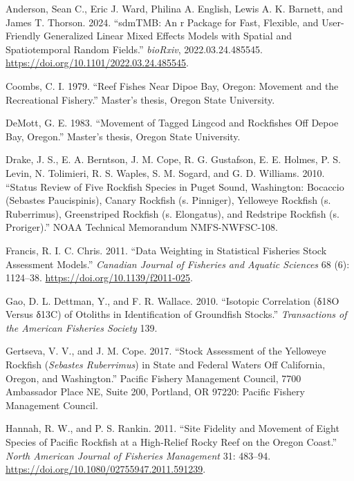 \documentclass[
]{scrartcl}
\newlength{\cslhangindent}
\newenvironment{CSLReferences}[2] %
 {\begin{list}{}{%
  \setlength{\itemindent}{0pt}
  \setlength{\leftmargin}{0pt}
  \setlength{\parsep}{0pt}
  \ifodd #1
   \setlength{\leftmargin}{\cslhangindent}
   \setlength{\itemindent}{-1\cslhangindent}
  \fi
  \setlength{\itemsep}{#2\baselineskip}}}
 {\end{list}}
\begin{document}
\label{refs}
\begin{CSLReferences}{1}{0}
Anderson, Sean C., Eric J. Ward, Philina A. English, Lewis A. K.
Barnett, and James T. Thorson. 2024. {``sdmTMB: An r Package for Fast,
Flexible, and User-Friendly Generalized Linear Mixed Effects Models with
Spatial and Spatiotemporal Random Fields.''} \emph{bioRxiv},
2022.03.24.485545. \url{https://doi.org/10.1101/2022.03.24.485545}.

Coombs, C. I. 1979. {``Reef Fishes Near Dipoe Bay, Oregon: Movement and
the Recreational Fishery.''} Master's thesis, Oregon State University.

DeMott, G. E. 1983. {``Movement of Tagged Lingcod and Rockfishes Off
Depoe Bay, Oregon.''} Master's thesis, Oregon State University.

Drake, J. S., E. A. Berntson, J. M. Cope, R. G. Gustafson, E. E. Holmes,
P. S. Levin, N. Tolimieri, R. S. Waples, S. M. Sogard, and G. D.
Williams. 2010. {``Status Review of Five Rockfish Species in Puget
Sound, Washington: Bocaccio (Sebastes Paucispinis), Canary Rockfish (s.
Pinniger), Yelloweye Rockfish (s. Ruberrimus), Greenstriped Rockfish (s.
Elongatus), and Redstripe Rockfish (s. Proriger).''} NOAA Technical
Memorandum NMFS-NWFSC-108.

Francis, R. I. C. Chris. 2011. {``Data Weighting in Statistical
Fisheries Stock Assessment Models.''} \emph{Canadian Journal of
Fisheries and Aquatic Sciences} 68 (6): 1124--38.
\url{https://doi.org/10.1139/f2011-025}.

Gao, D. L. Dettman, Y., and F. R. Wallace. 2010. {``Isotopic Correlation
(δ18O Versus δ13C) of Otoliths in Identification of Groundfish
Stocks.''} \emph{Transactions of the American Fisheries Society} 139.

Gertseva, V. V., and J. M. Cope. 2017. {``Stock Assessment of the
Yelloweye Rockfish (\emph{{Sebastes} Ruberrimus}) in State and {Federal}
Waters Off {California}, {Oregon}, and {Washington}.''} Pacific Fishery
Management Council, 7700 Ambassador Place NE, Suite 200, Portland, OR
97220: Pacific Fishery Management Council.

Hannah, R. W., and P. S. Rankin. 2011. {``Site Fidelity and Movement of
Eight Species of Pacific Rockfish at a High-Relief Rocky Reef on the
Oregon Coast.''} \emph{North American Journal of Fisheries Management}
31: 483--94. \url{https://doi.org/10.1080/02755947.2011.591239}.


\end{CSLReferences}
\end{document}
